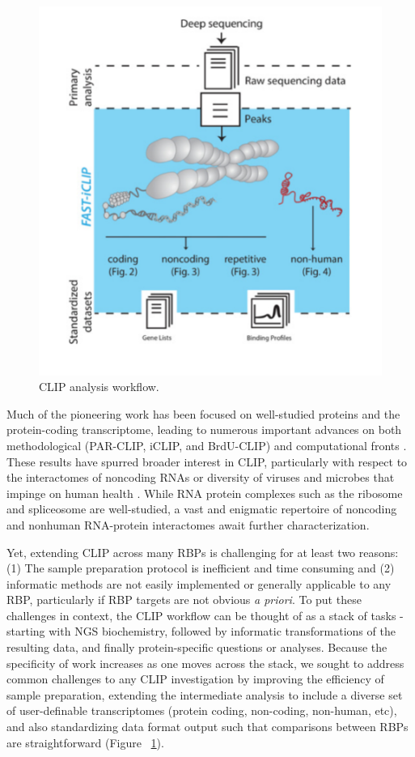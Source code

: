 \begin{figure}
\center\includegraphics[width=120mm,scale=0.5]{Figures/Fig15}
\caption{CLIP analysis workflow.}
\label{fig:Fig15}
\end{figure}

Much of the pioneering work has been focused on well-studied proteins and the protein-coding transcriptome, leading to numerous important advances on both methodological (PAR-CLIP, iCLIP, and BrdU-CLIP) and computational fronts \cite{Flynn:2014bi}. These results have spurred broader interest in CLIP, particularly with respect to the interactomes of noncoding RNAs or diversity of viruses and microbes that impinge on human health \cite{Consortium:2012bb}. While RNA protein complexes such as the ribosome and spliceosome are well-studied, a vast and enigmatic repertoire of noncoding and nonhuman RNA-protein interactomes await further characterization. 

Yet, extending CLIP across many RBPs is challenging for at least two reasons: (1) The sample preparation protocol is inefficient and time consuming and (2) informatic methods are not easily implemented or generally applicable to any RBP, particularly if RBP targets are not obvious \emph{a priori}. To put these challenges in context, the CLIP workflow can be thought of as a stack of tasks - starting with NGS biochemistry, followed by informatic transformations of the resulting data, and finally protein-specific questions or analyses. Because the specificity of work increases as one moves across the stack, we sought to address common challenges to any CLIP investigation by improving the efficiency of sample preparation, extending the intermediate analysis to include a diverse set of user-definable transcriptomes (protein coding, non-coding, non-human, etc), and also standardizing data format output such that comparisons between RBPs are straightforward (Figure ~\ref{fig:Fig15}).

